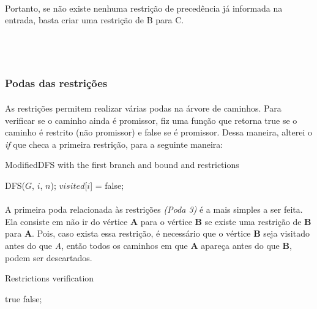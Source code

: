 \documentclass[a4paper, 12pt]{article}
\begin{document}
\paragraph{}
Portanto, se não existe nenhuma restrição de precedência já informada na entrada, basta criar uma restrição de B para C.
\\
\\
\\
\\
\subsubsection{Podas das restrições}

\paragraph{}
As restrições permitem realizar várias podas na árvore de caminhos. Para verificar se o caminho ainda é promissor, fiz uma função que retorna true se o caminho é restrito (não promissor) e false se é promissor. Dessa maneira, alterei o \textit{if} que checa a primeira restrição, para a seguinte maneira:

\begin{algorithm}
\caption{ModifiedDFS with the first branch and bound and restrictions}
\begin{algorithmic}

	\State DFS($G$, $i$, $n$);
	\State $visited$[$i$] = false;			
\EndIf
		
\end{algorithmic}
\end{algorithm}

\paragraph{}
A primeira poda relacionada às restrições \textit{(Poda 3)} é a mais simples a ser feita. Ela consiste em não ir do vértice \textbf{A} para o vértice  \textbf{B} se existe uma restrição de \textbf{B} para \textbf{A}. Pois, caso exista essa restrição, é necessário que o vértice \textbf{B} seja visitado antes do que \textit{A}, então todos os caminhos em que \textbf{A} apareça antes do que \textbf{B}, podem ser descartados.

\begin{algorithm}
\caption{Restrictions verification}
\begin{algorithmic}

    
	\State \Return true
\Else
	\State \Return false;			
\EndIf
	
\EndFunction

\end{algorithmic}
\end{algorithm}
\end{document}
